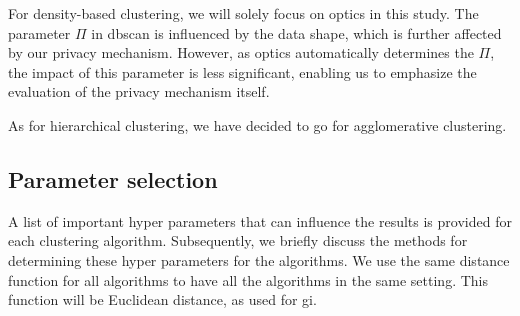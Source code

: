 For density-based clustering, we will solely focus on \gls{optics} in this study.
The parameter $\Pi$ in \gls{dbscan} is influenced by the data shape, which is further affected by our privacy mechanism.
However, as \gls{optics} automatically determines the $\Pi$, the impact of this parameter is less significant, enabling us to emphasize the evaluation of the privacy mechanism itself.

As for hierarchical clustering, we have decided to go for agglomerative clustering.


\subsection{Parameter selection}
A list of important hyper parameters that can influence the results is provided for each clustering algorithm.
Subsequently, we briefly discuss the methods for determining these hyper parameters for the algorithms. \newline
We use the same distance function for all algorithms to have all the algorithms in the same setting.
This function will be Euclidean distance, as used for \gls{gi}.
